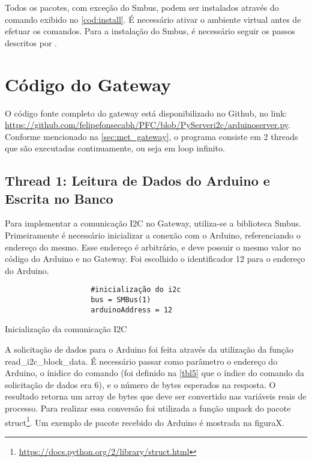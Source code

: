 			Todos os pacotes, com exceção do Smbus, podem ser instalados através do comando exibido no \autoref{cod:install}. É necessário ativar o ambiente virtual antes de efetuar os comandos. Para a instalação do Smbus, é necessário seguir os passos descritos por \textcite{dipto2015}. 
			
		
		
		\section{Código do Gateway}
			O código fonte completo do gateway está disponibilizado no Github, no link: \url{https://github.com/felipefonsecabh/PFC/blob/PyServeri2c/arduinoserver.py}. Conforme mencionado na \autoref{sec:met_gateway}, o programa consiste em 2 threads que são executadas continuamente, ou seja em loop infinito.
			
			\subsection{Thread 1: Leitura de Dados do Arduino e Escrita no Banco}
				Para implementar a comunicação I2C no Gateway, utiliza-se a biblioteca Smbus. Primeiramente é necessário inicializar a conexão com o Arduino, referenciando o endereço do mesmo. Esse endereço é arbitrário, e deve possuir o mesmo valor no código do Arduino e no Gateway. Foi escolhido o identificador 12 para o endereço do Arduino.
				
				\begin{listing}
					\begin{verbatim}
					#inicialização do i2c
					bus = SMBus(1)
					arduinoAddress = 12				
					\end{verbatim}
					\caption{Inicialização da comunicação I2C}
					\label{cod:starti2c}
				\end{listing}
				
				A solicitação de dados para o Arduino foi feita através da utilização da função read\_i2c\_block\_data. É necessário passar como parâmetro o endereço do Arduino, o ínidice do comando (foi definido na \autoref{tbl5} que o índice do comando da solicitação de dados era 6), e o número de bytes esperados na resposta. O resultado retorna um array de bytes que deve ser convertido nas variáveis reais de processo. Para realizar essa conversão foi utilizada a função unpack do pacote struct\footnote{\url{https://docs.python.org/2/library/struct.html}}. Um exemplo de pacote recebido do Arduino é mostrada na figuraX.
				
